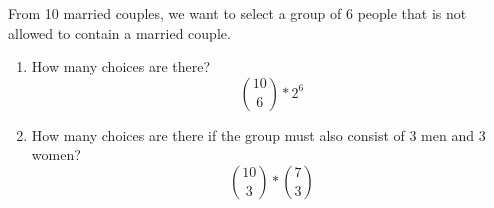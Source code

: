 \item From 10 married couples, we want to select a group of 6 people that is not allowed to contain a married couple.
\begin{enumerate}
    \item How many choices are there?
    \[ \binom{10}{6} * 2^6 \]
    
    \item How many choices are there if the group must also consist of 3 men and 3 women?
    \[ \binom{10}{3} * \binom{7}{3} \]
\end{enumerate} 